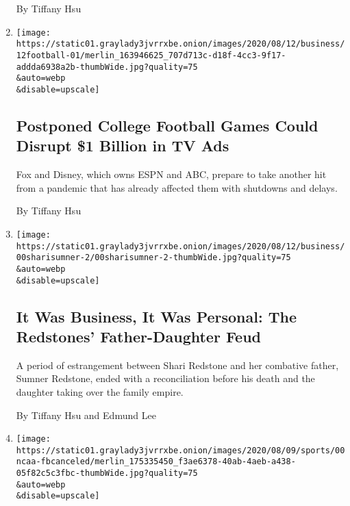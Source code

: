 \begin{enumerate}
  By Tiffany Hsu
\item
  \href{/2020/08/12/business/media/college-football-ads-coronavirus.html}{}

  \texttt{[image: https://static01.graylady3jvrrxbe.onion/images/2020/08/12/business/12football-01/merlin\_163946625\_707d713c-d18f-4cc3-9f17-addda6938a2b-thumbWide.jpg?quality=75\\\&auto=webp\\\&disable=upscale]}

  \hypertarget{postponed-college-football-games-could-disrupt-1-billion-in-tv-ads}{%
  \subsection{Postponed College Football Games Could Disrupt \$1 Billion
  in TV
  Ads}\label{postponed-college-football-games-could-disrupt-1-billion-in-tv-ads}}

  Fox and Disney, which owns ESPN and ABC, prepare to take another hit
  from a pandemic that has already affected them with shutdowns and
  delays.

  By Tiffany Hsu
\item
  \href{/2020/08/12/business/media/shari-redstone-sumner-redstone-viacomcbs.html}{}

  \texttt{[image: https://static01.graylady3jvrrxbe.onion/images/2020/08/12/business/00sharisumner-2/00sharisumner-2-thumbWide.jpg?quality=75\\\&auto=webp\\\&disable=upscale]}

  \hypertarget{it-was-business-it-was-personal-the-redstones-father-daughter-feud}{%
  \subsection{It Was Business, It Was Personal: The Redstones'
  Father-Daughter
  Feud}\label{it-was-business-it-was-personal-the-redstones-father-daughter-feud}}

  A period of estrangement between Shari Redstone and her combative
  father, Sumner Redstone, ended with a reconciliation before his death
  and the daughter taking over the family empire.

  By Tiffany Hsu and Edmund Lee
\item
  \href{/2020/08/11/sports/ncaafootball/big-ten-postpones-football-season.html}{}

  \texttt{[image: https://static01.graylady3jvrrxbe.onion/images/2020/08/09/sports/00ncaa-fbcanceled/merlin\_175335450\_f3ae6378-40ab-4aeb-a438-05f82c5c3fbc-thumbWide.jpg?quality=75\\\&auto=webp\\\&disable=upscale]}


\end{enumerate}
